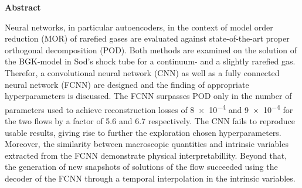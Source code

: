 

%
%
{
\pagestyle{empty}
\begin{center}
{\sffamily \bfseries\Large Abstract}\\
\end{center}%
\vspace{1cm}
%
Neural networks, in particular autoencoders, in the context of model order reduction (MOR) of rarefied gases are evaluated against state-of-the-art proper orthogonal decomposition (POD). Both methods are examined on the solution of the BGK-model in Sod's shock tube for a continuum- and a slightly rarefied gas. Therefor, a convolutional neural network (CNN) as well as a fully connected neural network (FCNN) are designed and the finding of appropriate hyperparameters is discussed. The FCNN surpasses POD only in the number of parameters used to achieve reconstruction losses of \num{8e-4} and \num{9e-4} for the two flows by a factor of 5.6 and 6.7 respectively. The CNN fails to reproduce usable results, giving rise to further the exploration chosen hyperparameters. Moreover, the similarity between macroscopic quantities and intrinsic variables extracted from the FCNN demonstrate physical interpretabillity. Beyond that, the generation of new snapshots of solutions of the flow succeeded using the decoder of the FCNN through a temporal interpolation in the intrinsic variables.
\vspace{1.5cm}

}
